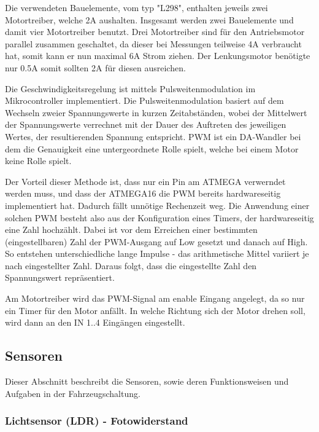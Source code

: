 \documentclass{scrartcl}
\begin{document}

		Die verwendeten Bauelemente, vom typ "L298", enthalten jeweils zwei Motortreiber, welche 2A aushalten.
		Insgesamt werden zwei Bauelemente und damit vier Motortreiber benutzt.
		Drei Motortreiber sind für den Antriebsmotor parallel zusammen geschaltet, da dieser 
		bei Messungen teilweise 4A verbraucht hat, somit kann er nun maximal 6A Strom ziehen.
		Der Lenkungsmotor benötigte nur 0.5A somit sollten 2A für diesen ausreichen.
				

		Die Geschwindigkeitsregelung ist mittels Pulsweitenmodulation im Mikrocontroller implementiert.
		Die Pulsweitenmodulation basiert auf dem Wechseln zweier Spannungswerte in kurzen Zeitabständen, wobei
		der Mittelwert der Spannungswerte verrechnet mit der Dauer des Auftreten des jeweiligen Wertes,
		der resultierenden Spannung entspricht.
		PWM ist ein DA-Wandler bei dem die Genauigkeit eine untergeordnete Rolle spielt, welche bei
		einem Motor keine Rolle spielt.

		Der Vorteil dieser Methode ist, dass nur ein Pin am ATMEGA verwerndet werden muss, und dass der ATMEGA16 die PWM
		bereits hardwareseitig implementiert hat. Dadurch fällt unnötige Rechenzeit weg.
		Die Anwendung einer solchen PWM besteht also aus der Konfiguration eines Timers,
		der hardwareseitig eine Zahl hochzählt. Dabei ist vor dem Erreichen einer bestimmten
		(eingestellbaren) Zahl der PWM-Ausgang auf Low gesetzt und danach auf High.
		So entstehen unterschiedliche lange Impulse - das arithmetische Mittel variiert je nach eingestellter Zahl.
		Daraus folgt, dass die eingestellte Zahl den Spannungswert repräsentiert.

		Am Motortreiber wird das PWM-Signal am enable Eingang angelegt, da so nur ein Timer für den Motor anfällt.
		In welche Richtung sich der Motor drehen soll, wird dann an den IN 1..4 Eingängen eingestellt.
		
	
	\subsection{Sensoren}
		Dieser Abschnitt beschreibt die Sensoren, sowie deren Funktionsweisen und Aufgaben
		in der Fahrzeugschaltung.


		\subsubsection{Lichtsensor (LDR) - Fotowiderstand} %
\end{document}
